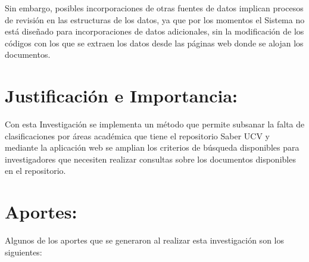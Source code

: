 \documentclass[
  10,
  openany]{book}
\begin{document}
Sin embargo, posibles incorporaciones de otras fuentes de datos implican procesos de revisión en las estructuras de los datos, ya que por los momentos el Sistema no está diseñado para incorporaciones de datos adicionales, sin la modificación de los códigos con los que se extraen los datos desde las páginas web donde se alojan los documentos.

\hypertarget{justificacion}{%
\section{Justificación e Importancia:}\label{justificacion}}

Con esta Investigación se implementa un método que permite subsanar la falta de clasificaciones por áreas académica que tiene el repositorio Saber UCV y mediante la aplicación web se amplian los criterios de búsqueda disponibles para investigadores que necesiten realizar consultas sobre los documentos disponibles en el repositorio.

\hypertarget{aportes}{%
\section{Aportes:}\label{aportes}}

Algunos de los aportes que se generaron al realizar esta investigación son los siguientes:
\end{document}
